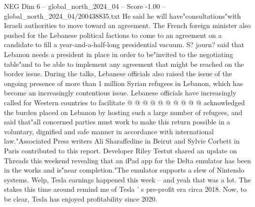 \begin{textsample}{NEG Dim 6 – global\_north\_2024\_04 – Score -1.00 – global\_north\_2024\_04/200438835.txt}
He said he will have"consultations"with Israeli authorities to move toward an agreement.
The French foreign minister also pushed for the Lebanese political factions to come to an agreement on a candidate to fill a year-and-a-half-long presidential vacuum.
S? journ? said that Lebanon needs a president in place in order to be"invited to the negotiating table"and to be able to implement any agreement that might be reached on the border issue.
During the talks, Lebanese officials also raised the issue of the ongoing presence of more than 1 million Syrian refugees in Lebanon, which has become an increasingly contentious issue.
Lebanese officials have increasingly called for Western countries to facilitate @ @ @ @ @ @ @ @ @ @ acknowledged the burden placed on Lebanon by hosting such a large number of refugees, and said that"all concerned parties must work to make this return possible in a voluntary, dignified and safe manner in accordance with international law."Associated Press writers Ali Sharaffedine in Beirut and Sylvie Corbett in Paris contributed to this report.
Developer Riley Testut shared an update on Threads this weekend revealing that an iPad app for the Delta emulator has been in the works and is"near completion."The emulator supports a slew of Nintendo systems.
Welp, Tesla earnings happened this week -- and yeah that was a lot.
The stakes this time around remind me of Tesla ' s pre-profit era circa 2018.
Now, to be clear, Tesla has enjoyed profitability since 2020.

\end{textsample}

